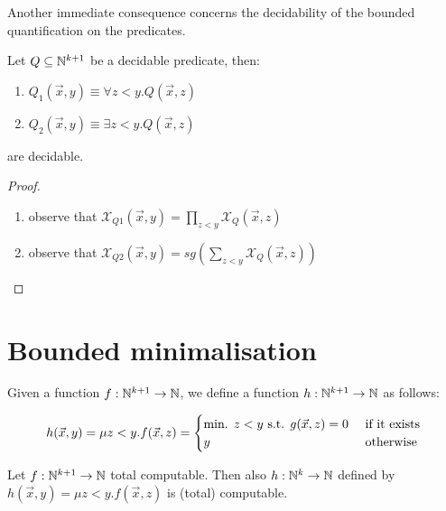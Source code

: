 Another immediate consequence concerns the decidability of the bounded quantification on the predicates.

\begin{lemma}
  Let $Q\subseteq \mathbb{N}^{k+1}$ be a decidable predicate, then:
  \begin{enumerate}
  \item $Q_1(\vec{x},y) \equiv \forall z<y. Q(\vec{x},z)$
  \item $Q_2(\vec{x},y) \equiv \exists z<y. Q(\vec{x},z)$
  \end{enumerate}  
  are decidable.
\end{lemma}

\begin{proof}
  \begin{enumerate}
  \item observe that $\mathcal{X}_{Q1}(\vec{x},y) = \prod_{z<y}\mathcal{X}_Q(\vec{x},z)$
  \item observe that $\mathcal{X}_{Q2}(\vec{x},y) = sg(\sum_{z<y}\mathcal{X}_Q(\vec{x},z))$
  \end{enumerate}
\end{proof}

\section{Bounded minimalisation}
Given a function $f: \mathbb{N}^{k+1} \rightarrow \mathbb{N}$, we define a function $h: \mathbb{N}^{k+1} \rightarrow \mathbb{N}$ as follows:

\begin{equation*}
  h(\vec{x},y) = \mu z<y . f(\vec{x},z) =
  \begin{cases}
    $min. $z<y$ s.t. $ g(\vec{x},z) = 0 & $ if it exists$ \\
    y                                   & $ otherwise $
  \end{cases}
\end{equation*}


\begin{lemma}
  Let $f: \mathbb{N}^{k+1} \rightarrow \mathbb{N}$ total computable. Then also
  $h: \mathbb{N}^{k} \rightarrow \mathbb{N}$ defined by
  $h(\vec{x},y) = \mu z<y. f(\vec{x},z)$ is (total) computable.
\end{lemma}

